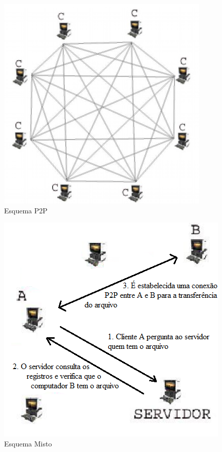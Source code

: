 \documentclass[a4paper]{article}
\begin{document}
\begin{figure}
\begin{center}
  \includegraphics{img//p2p.png}
  \caption{Esquema P2P \cite{sisp2p}} 
\end{center}
\end{figure}

\begin{figure}
\begin{center}
  \includegraphics{img//misto.png}
  \caption{Esquema Misto \cite{sisp2p}} 
\end{center}
\end{figure}
\end{document}
